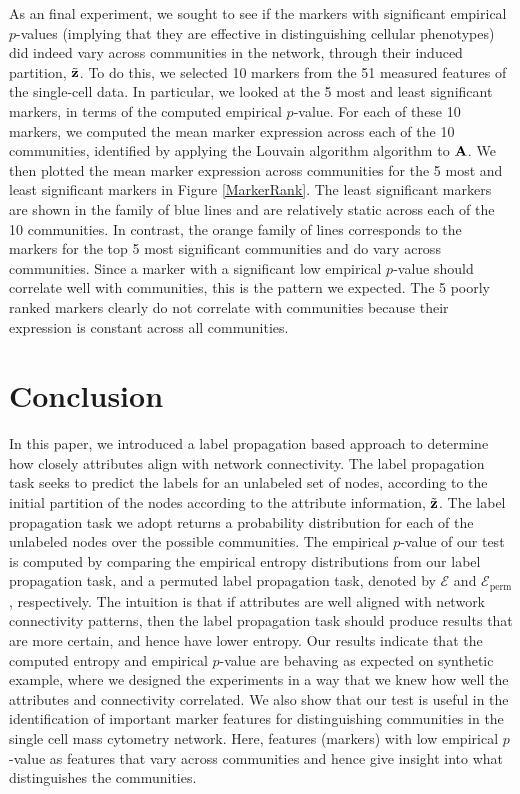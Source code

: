 As an final experiment, we sought to see if the markers with significant empirical $p$-values (implying that they are effective in distinguishing cellular phenotypes) did indeed vary across communities in the network, through their induced partition, $\tilde{\bf z}$. To do this, we selected 10 markers from the 51 measured features of the single-cell data. In particular, we looked at the 5 most and least significant markers, in terms of the computed empirical $p$-value. For each of these 10 markers, we computed the mean marker expression across each of the 10 communities, identified by applying the Louvain algorithm \cite{blondel} algorithm to ${\bf A}$. We then plotted the mean marker expression across communities for the 5 most and least significant markers in Figure \ref{MarkerRank}. The least significant markers are shown in the family of blue lines and are relatively static across each of the 10 communities. In contrast, the orange family of lines corresponds to the markers for the top 5 most significant communities and do vary across communities. Since a marker with a significant low empirical $p$-value should correlate well with communities, this is the pattern we expected. The 5 poorly ranked markers clearly do not correlate with communities because their expression is constant across all communities.

\section{Conclusion}
In this paper, we introduced a label propagation based approach to determine how closely attributes align with network connectivity. The label propagation task seeks to predict the labels for an unlabeled set of nodes, according to the initial partition of the nodes according to the attribute information, $\tilde{\bf z}$. The label propagation task we adopt returns a probability distribution for each of the unlabeled nodes over the possible communities. The empirical $p$-value of our test is computed by comparing the empirical entropy distributions from our label propagation task, and a permuted label propagation task, denoted by $\mathcal{E}$ and $\mathcal{E}_{\text{perm}}$, respectively. The intuition is that if attributes are well aligned with network connectivity patterns, then the label propagation task should produce results that are more certain, and hence have lower entropy. Our results indicate that the computed entropy and empirical $p$-value are behaving as expected on synthetic example, where we designed the experiments in a way that we knew how well the attributes and connectivity correlated. We also show that our test is useful in the identification of important marker features for distinguishing communities in the single cell mass cytometry network. Here, features (markers) with low empirical $p$-value as features that vary across communities and hence give insight into what distinguishes the communities. 

